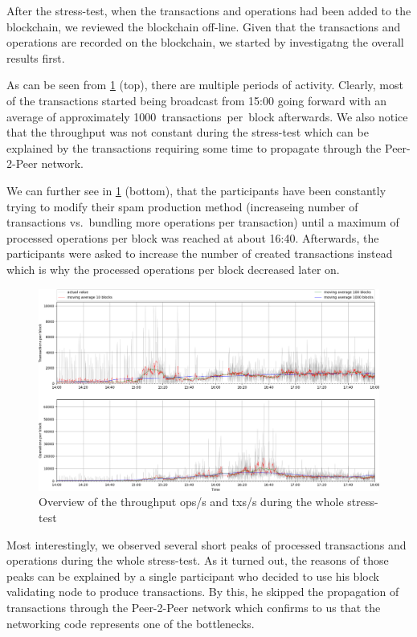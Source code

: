 After the stress-test, when the transactions and operations had been added to
the blockchain, we reviewed the blockchain off-line. Given
that the transactions and operations are recorded on the blockchain, we
started by investigatng the overall results first.

As can be seen from \cref{fig:tpsall} (top), there are multiple periods of
activity. Clearly, most of the transactions started being
broadcast from 15:00 going forward with an average of approximately
\SI{1000}{transactions per block} afterwards. We also notice that the
throughput was not constant during the stress-test which can be explained by the
transactions requiring some time to propagate through the Peer-2-Peer network.

We can further see in \cref{fig:tpsall} (bottom), that the participants have
been constantly trying to modify their spam production method (increaseing number
of transactions vs.\ bundling more operations per transaction) until a maximum
of processed operations per block was reached at about 16:40. Afterwards, the
participants were asked to increase the number of created transactions
instead which is why the processed operations per block decreased later on.

\begin{figure}[!htp]
 \centering
 \includegraphics[width=\linewidth]{figures/stress-test-overview.png}
 \caption{Overview of the throughput ops/s and txs/s during the whole stress-test}
 \label{fig:tpsall}
\end{figure}

Most interestingly, we observed several short peaks of processed transactions and
operations during the whole stress-test. As it turned out, the reasons of those
peaks can be explained by a single participant who decided to use his
block validating node to produce transactions. By this, he skipped the
propagation of transactions through the Peer-2-Peer network which confirms to
us that the networking code represents one of the bottlenecks.


